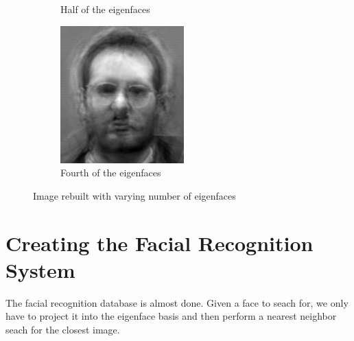 \begin{figure}
\begin{subfigure}[b]{0.3\textwidth}
\caption{Half of the eigenfaces}
\end{subfigure}
\begin{subfigure}[b]{0.3\textwidth}
\includegraphics[width=\textwidth]{rebuiltFourth.png}
\caption{Fourth of the eigenfaces}
\end{subfigure}
\caption{Image rebuilt with varying number of eigenfaces}
\label{facialRecognition:rebuiltImage}
\end{figure}

\section*{Creating the Facial Recognition System}

The facial recognition database is almost done.
Given a face to seach for, we only have to project it into the eigenface basis and then perform a nearest neighbor seach for the closest image.

